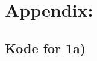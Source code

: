 \documentclass[a4paper,norsk, 10pt]{article}
\numberwithin{equation}{section}
\begin{document}
\newpage

\section{Appendix:}
\subsection*{Kode for 1a)}

\label{lst:solver}
\end{document}
